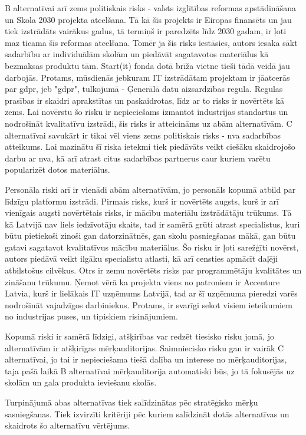 B alternatīvai arī zems politiskais risks - valsts izglītības reformas apstādināšana un
Skola 2030 projekta atcelšana. Tā kā šis projekts ir Eiropas finansēts un jau tiek izstrādāts
vairākus gadus, tā termiņš ir paredzēts līdz 2030 gadam, ir ļoti maz ticama šīs reformas
atcelšana. Tomēr ja šis risks iestāsies, autors iesaka sākt sadarbību ar individuālām skolām
un piedāvāt sagatavotos materiālus kā bezmaksas produktu tām. Start(it) fonda dotā brīža
vietne tieši tādā veidā jau darbojās. Protams, mūsdienās jebkuram IT izstrādātam projektam
ir jāatcerās par \acrshort{gdpr}, jeb "\gls{gdpr}", tulkojumā - Ģenerālā datu aizsardzības
regula. Regulas prasības ir skaidri aprakstītas un paskaidrotas, līdz ar to risks ir novērtēts
kā zems. Lai novērstu šo risku ir nepieciešams izmantot industrijas standartus un nodrošināt
kvalitatīvu izstrādi, šis risks ir atteicināms uz abām alternatīvām. C alternatīvai savukārt
ir tikai vēl viens zems politiskais risks - \acrshort{nva} sadarbības atteikums. Lai mazinātu
šī riska ietekmi tiek piedāvāts veikt ciešāku skaidrojošo darbu ar \acrshort{nva}, kā arī
atrast citus sadarbības partnerus caur kuriem varētu popularizēt dotos materiālus.
\par
Personāla riski arī ir vienādi abām alternatīvām, jo personāls kopumā atbild par līdzīgu
platformu izstrādi. Pirmais risks, kurš ir novērtēts augsts, kurš ir arī vienīgais augsti
novērtētais risks, ir mācību materiālu izstrādātāju trūkums. Tā kā Latvijā nav liels iedzīvotāju
skaits, tad ir samērā grūti atrast specialistus, kuri būtu pietiekoši zinoši gan datorzinātnēs,
gan skolu pasniegšanas mākā, gan būtu gatavi sagatavot kvalitatīvus mācību materiālus. Šo risku
ir ļoti sarežģīti novērst, autors piedāvā veikt ilgāku specialistu atlasti, kā arī censties
apmācīt daļēji atbilstošus cilvēkus. Otrs ir zemu novērtēts risks par programmētāju kvalitātes
un zināšanu trūkumu. Ņemot vērā ka projekta viens no patroniem ir Accenture Latvia, kurš ir
lielākais IT uzņēmums Latvijā, tad ar šī uzņēmuma pieredzi varēs nodrošināt vajadzīgos darbiniekus.
Protams, ir svarīgi sekot visiem ieteikumiem no industrijas puses, un tipiskiem risinājumiem.
\par
Kopumā riski ir samērā līdzigi, atšķirības var redzēt tiesisko risku jomā, jo alternatīvām
ir atšķirīgas mērķauditorijas. Saimniecisko risku gan ir vairāk C alternatīvai, jo tai ir nepieciešama
tiešā dalība un interese no mērķauditorijas, taja pašā laikā B alternatīvai mērķauditorija automatiski
būs, jo tā fokusējās uz skolām un gala produkta ieviešanu skolās.
\par
Turpinājumā abas alternatīvas tiek salīdzinātas pēc stratēģisko mērķu sasniegšanas. Tiek izvirzīti
kritēriji pēc kuriem salīdzināt dotās alternatīvas un skaidrots šo alternatīvu vērtējums.



